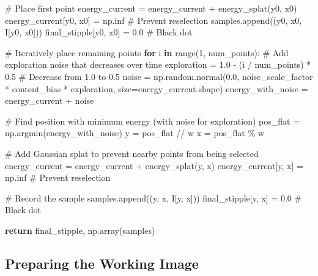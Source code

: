 \documentclass[
  letterpaper,
  DIV=11,
  numbers=noendperiod]{scrartcl}
\newenvironment{Shaded}{\begin{snugshade}}{\end{snugshade}}
\newcommand{\BuiltInTok}[1]{\textcolor[rgb]{0.00,0.23,0.31}{#1}}
\newcommand{\CommentTok}[1]{\textcolor[rgb]{0.37,0.37,0.37}{#1}}
\newcommand{\ControlFlowTok}[1]{\textcolor[rgb]{0.00,0.23,0.31}{\textbf{#1}}}
\newcommand{\DecValTok}[1]{\textcolor[rgb]{0.68,0.00,0.00}{#1}}
\newcommand{\FloatTok}[1]{\textcolor[rgb]{0.68,0.00,0.00}{#1}}
\newcommand{\KeywordTok}[1]{\textcolor[rgb]{0.00,0.23,0.31}{\textbf{#1}}}
\newcommand{\NormalTok}[1]{\textcolor[rgb]{0.00,0.23,0.31}{#1}}
\newcommand{\OperatorTok}[1]{\textcolor[rgb]{0.37,0.37,0.37}{#1}}
\begin{document}
\begin{Shaded}
\begin{Highlighting}[]
    \CommentTok{\# Place first point}
\NormalTok{    energy\_current }\OperatorTok{=}\NormalTok{ energy\_current }\OperatorTok{+}\NormalTok{ energy\_splat(y0, x0)}
\NormalTok{    energy\_current[y0, x0] }\OperatorTok{=}\NormalTok{ np.inf  }\CommentTok{\# Prevent reselection}
\NormalTok{    samples.append((y0, x0, I[y0, x0]))}
\NormalTok{    final\_stipple[y0, x0] }\OperatorTok{=} \FloatTok{0.0}  \CommentTok{\# Black dot}

    \CommentTok{\# Iteratively place remaining points}
    \ControlFlowTok{for}\NormalTok{ i }\KeywordTok{in} \BuiltInTok{range}\NormalTok{(}\DecValTok{1}\NormalTok{, num\_points):}
        \CommentTok{\# Add exploration noise that decreases over time}
\NormalTok{        exploration }\OperatorTok{=} \FloatTok{1.0} \OperatorTok{{-}}\NormalTok{ (i }\OperatorTok{/}\NormalTok{ num\_points) }\OperatorTok{*} \FloatTok{0.5}  \CommentTok{\# Decrease from 1.0 to 0.5}
\NormalTok{        noise }\OperatorTok{=}\NormalTok{ np.random.normal(}\FloatTok{0.0}\NormalTok{, noise\_scale\_factor }\OperatorTok{*}\NormalTok{ content\_bias }\OperatorTok{*}\NormalTok{ exploration, size}\OperatorTok{=}\NormalTok{energy\_current.shape)}
\NormalTok{        energy\_with\_noise }\OperatorTok{=}\NormalTok{ energy\_current }\OperatorTok{+}\NormalTok{ noise}

        \CommentTok{\# Find position with minimum energy (with noise for exploration)}
\NormalTok{        pos\_flat }\OperatorTok{=}\NormalTok{ np.argmin(energy\_with\_noise)}
\NormalTok{        y }\OperatorTok{=}\NormalTok{ pos\_flat }\OperatorTok{//}\NormalTok{ w}
\NormalTok{        x }\OperatorTok{=}\NormalTok{ pos\_flat }\OperatorTok{\%}\NormalTok{ w}

        \CommentTok{\# Add Gaussian splat to prevent nearby points from being selected}
\NormalTok{        energy\_current }\OperatorTok{=}\NormalTok{ energy\_current }\OperatorTok{+}\NormalTok{ energy\_splat(y, x)}
\NormalTok{        energy\_current[y, x] }\OperatorTok{=}\NormalTok{ np.inf  }\CommentTok{\# Prevent reselection}

        \CommentTok{\# Record the sample}
\NormalTok{        samples.append((y, x, I[y, x]))}
\NormalTok{        final\_stipple[y, x] }\OperatorTok{=} \FloatTok{0.0}  \CommentTok{\# Black dot}

    \ControlFlowTok{return}\NormalTok{ final\_stipple, np.array(samples)}
\end{Highlighting}
\end{Shaded}

\subsection{Preparing the Working
Image}\label{preparing-the-working-image}
\end{document}
